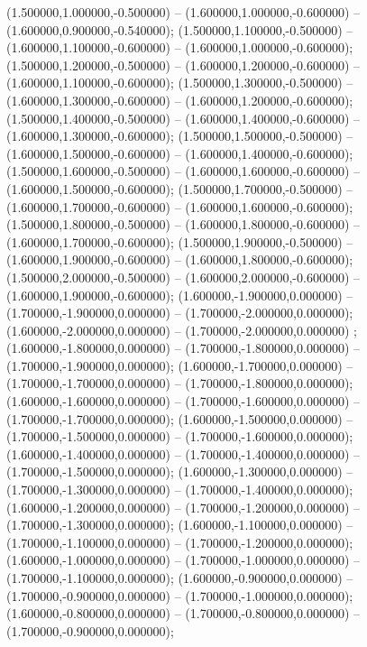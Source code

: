  (1.500000,1.000000,-0.500000) -- (1.600000,1.000000,-0.600000) -- (1.600000,0.900000,-0.540000);
 (1.500000,1.100000,-0.500000) -- (1.600000,1.100000,-0.600000) -- (1.600000,1.000000,-0.600000);
 (1.500000,1.200000,-0.500000) -- (1.600000,1.200000,-0.600000) -- (1.600000,1.100000,-0.600000);
 (1.500000,1.300000,-0.500000) -- (1.600000,1.300000,-0.600000) -- (1.600000,1.200000,-0.600000);
 (1.500000,1.400000,-0.500000) -- (1.600000,1.400000,-0.600000) -- (1.600000,1.300000,-0.600000);
 (1.500000,1.500000,-0.500000) -- (1.600000,1.500000,-0.600000) -- (1.600000,1.400000,-0.600000);
 (1.500000,1.600000,-0.500000) -- (1.600000,1.600000,-0.600000) -- (1.600000,1.500000,-0.600000);
 (1.500000,1.700000,-0.500000) -- (1.600000,1.700000,-0.600000) -- (1.600000,1.600000,-0.600000);
 (1.500000,1.800000,-0.500000) -- (1.600000,1.800000,-0.600000) -- (1.600000,1.700000,-0.600000);
 (1.500000,1.900000,-0.500000) -- (1.600000,1.900000,-0.600000) -- (1.600000,1.800000,-0.600000);
 (1.500000,2.000000,-0.500000) -- (1.600000,2.000000,-0.600000) -- (1.600000,1.900000,-0.600000);
 (1.600000,-1.900000,0.000000) -- (1.700000,-1.900000,0.000000) -- (1.700000,-2.000000,0.000000);
 (1.600000,-2.000000,0.000000) -- (1.700000,-2.000000,0.000000) ;
 (1.600000,-1.800000,0.000000) -- (1.700000,-1.800000,0.000000) -- (1.700000,-1.900000,0.000000);
 (1.600000,-1.700000,0.000000) -- (1.700000,-1.700000,0.000000) -- (1.700000,-1.800000,0.000000);
 (1.600000,-1.600000,0.000000) -- (1.700000,-1.600000,0.000000) -- (1.700000,-1.700000,0.000000);
 (1.600000,-1.500000,0.000000) -- (1.700000,-1.500000,0.000000) -- (1.700000,-1.600000,0.000000);
 (1.600000,-1.400000,0.000000) -- (1.700000,-1.400000,0.000000) -- (1.700000,-1.500000,0.000000);
 (1.600000,-1.300000,0.000000) -- (1.700000,-1.300000,0.000000) -- (1.700000,-1.400000,0.000000);
 (1.600000,-1.200000,0.000000) -- (1.700000,-1.200000,0.000000) -- (1.700000,-1.300000,0.000000);
 (1.600000,-1.100000,0.000000) -- (1.700000,-1.100000,0.000000) -- (1.700000,-1.200000,0.000000);
 (1.600000,-1.000000,0.000000) -- (1.700000,-1.000000,0.000000) -- (1.700000,-1.100000,0.000000);
 (1.600000,-0.900000,0.000000) -- (1.700000,-0.900000,0.000000) -- (1.700000,-1.000000,0.000000);
 (1.600000,-0.800000,0.000000) -- (1.700000,-0.800000,0.000000) -- (1.700000,-0.900000,0.000000);
